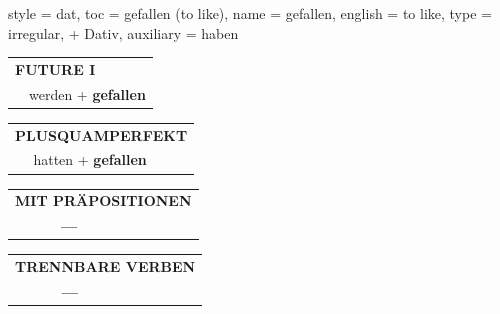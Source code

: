 \begin{verbentry}{
  style = {dat},
  toc = {gefallen (to like)},
  name = {gefallen},
  english = {to like},
  type = {irregular, + Dativ},
  auxiliary = {haben}
}
\begin{tabular}{rl}
    \multicolumn{2}{l}{\textbf{FUTURE I} }\\
  &  werden + \textbf{gefallen}\\
 
  \end{tabular}
\hfill
   \begin{tabular}{rl}
      \multicolumn{2}{l}{\textbf{PLUSQUAMPERFEKT}}\\
   & hatten + \textbf{gefallen}\\
  \end{tabular}
  
  
\vspace{10pt}

\begin{tabular}{lll}
\multicolumn{3}{l}{\textbf{MIT PRÄPOSITIONEN}}\\
& \textbf{---} & \\
\end{tabular}
\hfill
\begin{tabular}{lll}
\multicolumn{3}{l}{\textbf{TRENNBARE VERBEN}}\\
& \textbf{---} & \\
\end{tabular}
\vspace{-5pt}
\end{verbentry}

